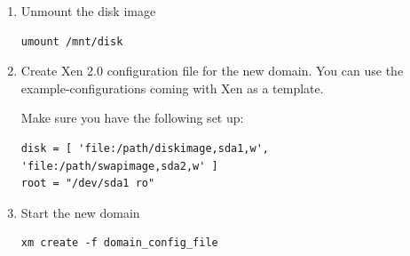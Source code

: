 \documentclass[11pt,twoside,final,openright]{report}
\begin{document}
{\begin{enumerate}
Edit the following files using vi or nano and make needed changes:
\begin{small}\begin{verbatim}
/etc/hostname
/etc/hosts
/etc/resolv.conf
/etc/network/interfaces
/etc/networks
\end{verbatim}\end{small}

Set up access to the services, edit:
\begin{small}\begin{verbatim}
/etc/hosts.deny
/etc/hosts.allow
/etc/inetd.conf
\end{verbatim}\end{small}

Add Debian mirror to:   
\begin{small}\begin{verbatim}
/etc/apt/sources.list
\end{verbatim}\end{small}

Create fstab like this:
\begin{small}\begin{verbatim}
/dev/sda1       /       ext3    errors=remount-ro       0       1
/dev/sda2       none    swap    sw                      0       0
proc            /proc   proc    defaults                0       0
\end{verbatim}\end{small}

Logout

\item      Unmount the disk image
\begin{small}\begin{verbatim}
umount /mnt/disk
\end{verbatim}\end{small}

\item Create Xen 2.0 configuration file for the new domain. You can
        use the example-configurations coming with Xen as a template.

        Make sure you have the following set up:
\begin{small}\begin{verbatim}
disk = [ 'file:/path/diskimage,sda1,w', 'file:/path/swapimage,sda2,w' ]
root = "/dev/sda1 ro"
\end{verbatim}\end{small}

\item Start the new domain
\begin{small}\begin{verbatim}
xm create -f domain_config_file
\end{verbatim}\end{small}


\end{enumerate}}
\end{document}
